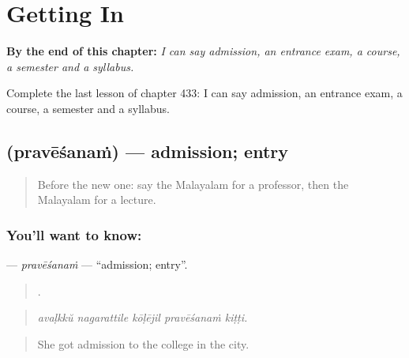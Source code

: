 
\chapter{Getting In}
\label{ch:ml-getting-in}

\begin{chapteropening}
\textbf{By the end of this chapter:} \emph{I can say admission, an entrance exam, a course, a semester and a syllabus.}

Complete the last lesson of chapter 433: I can say admission, an entrance exam, a course, a semester and a syllabus.
\end{chapteropening}

\section[\texorpdfstring{\ml{പ്രവേശനം} (pravēśanaṁ)}{പ്രവേശനം (pravēśanaṁ)}]{ (pravēśanaṁ) — admission; entry}

\label{lesson:ML-C433-pravesanam}



\begin{quote}
Before the new one: say the Malayalam for a professor, then the Malayalam for a lecture.
\end{quote}

\subsection*{You'll want to know: }
\textbf{} — \emph{pravēśanaṁ} — \textquotedblleft{}admission; entry\textquotedblright{}.

\begin{quote}
    .
\end{quote}

\begin{quote}
\emph{avaḷkkŭ nagarattile kōḷējil pravēśanaṁ kiṭṭi.}
\end{quote}

\begin{quote}
She got admission to the college in the city.
\end{quote}

